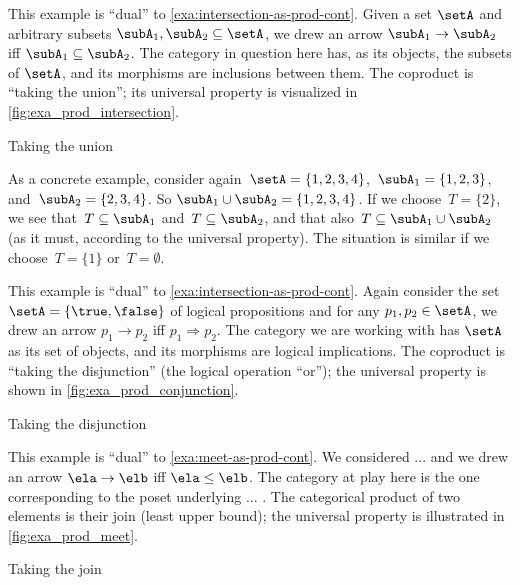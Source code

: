 \begin{example}\label{exa:union-as-coprod-cont}
This example is ``dual'' to \cref{exa:intersection-as-prod-cont}.
Given a set $\setA$ and arbitrary subsets $\subA_1, \subA_2 \subseteq \setA$, we drew an arrow $\subA_1 \to \subA_2$ iff $\subA_1 \subseteq \subA_2$. The category in question here has, as its objects, the subsets of $\setA$, and its morphisms are inclusions between them.
The coproduct is ``taking the union''; its universal property is visualized in \cref{fig:exa_prod_intersection}.
  \begin{marginfigure}
  \begin{center}
  \end{center}
    \caption{Taking the union}
    \label{fig:exa_coprod_union_cont}
  \end{marginfigure}
 As a concrete example, consider again~$\setA = \{ 1, 2, 3, 4 \}$,~$\subA_1 = \{ 1, 2, 3 \}$, and~$\subA_2 = \{2, 3, 4 \}$. So $\subA_1 \cup \subA_2 = \{1,2, 3,4\}$.
If we choose~$T = \{ 2 \}$, we see that~$T \subseteq \subA_1$ and~$T \subseteq \subA_2$, and that also~$T \subseteq \subA_1 \cup \subA_2$ (as it must, according to the universal property).
The situation is similar if we choose~$T = \{ 1\}$ or~$T = \emptyset$.
\end{example}


\begin{example}\label{exa:disjunction-as-coprod-cont}
This example is ``dual'' to \cref{exa:intersection-as-prod-cont}. Again consider the set $\setA = \{ \true, \false \}$ of logical propositions and for any $p_1, p_2  \in \setA$, we drew an arrow $p_1 \to p_2$ iff $p_1 \Rightarrow p_2$. The category we are working with has $\setA$ as its set of objects, and its morphisms are logical implications. The coproduct is ``taking the disjunction'' (the logical operation ``or''); the universal property is shown in \cref{fig:exa_prod_conjunction}.
  \begin{marginfigure}
  \begin{center}
  \end{center}
    \caption{Taking the disjunction}
    \label{fig:exa_coprod_disjunction_cont}
  \end{marginfigure}
\end{example}


\begin{example}\label{exa:join-as-coprod-cont}
This example is ``dual'' to \cref{exa:meet-as-prod-cont}. We considered ... and we drew an arrow $\ela \to \elb$ iff $\ela \leq \elb$. The category at play here is the one corresponding to the poset underlying ... . The categorical product of two elements is their join (least upper bound); the universal property is illustrated in \cref{fig:exa_prod_meet}.
  \begin{marginfigure}
  \begin{center}
  \end{center}
    \caption{Taking the join}
    \label{fig:exa_coprod_join_cont}
  \end{marginfigure}
\end{example}

